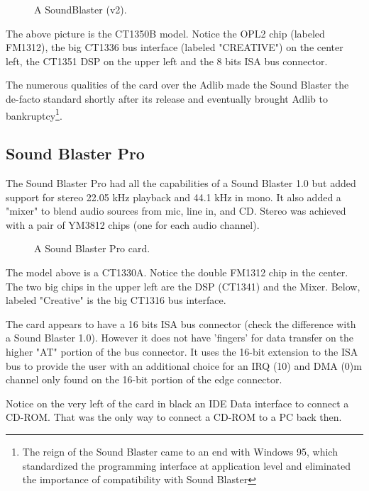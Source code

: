\documentclass[book.tex]{subfiles}
\begin{document}
\begin{figure}[H] 
  \centering 
  \caption{A SoundBlaster (v2). }
\end{figure}
\par
The above picture is the CT1350B model. Notice the OPL2 chip (labeled FM1312), the big CT1336 bus interface (labeled "CREATIVE") on the center left, the CT1351 DSP on the upper left and the 8 bits ISA bus connector.\\
\par
   The numerous qualities of the card over the Adlib made the Sound Blaster the de-facto standard shortly after its release and eventually brought Adlib to bankruptcy\footnote{The reign of the Sound Blaster came to an end with Windows 95, which standardized the programming interface at application level and eliminated the importance of compatibility with Sound Blaster}.





  \subsection{Sound Blaster Pro}
The Sound Blaster Pro had all the capabilities of a Sound Blaster 1.0 but added support for stereo 22.05 kHz playback and 44.1 kHz in mono. It also added a "mixer" to blend audio sources from mic, line in, and CD. Stereo was achieved with a pair of YM3812 chips (one for each audio channel).\\
\begin{figure}[H] 
  \centering 
  \caption{A Sound Blaster Pro card.}
\end{figure}
The model above is a CT1330A. Notice the double FM1312 chip in the center. The two big chips in the upper left are the DSP (CT1341) and the Mixer. Below, labeled "Creative" is the big CT1316 bus interface.\\
\par
{} The card appears to have a 16 bits ISA bus connector (check the difference with a Sound Blaster 1.0). However it does not have 'fingers' for data transfer on the higher "AT" portion of the bus connector. It uses the 16-bit extension to the ISA bus to provide the user with an additional choice for an IRQ (10) and DMA (0)m channel only found on the 16-bit portion of the edge connector.\\
\par
{} Notice on the very left of the card in black an IDE Data interface to connect a CD-ROM. That was the only way to connect a CD-ROM to a PC back then.
\end{document}
